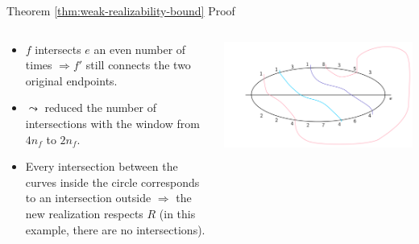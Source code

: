 \documentclass[10pt,aspectratio=169]{beamer}
\theoremstyle{plain}
\begin{document}
\begin{frame}{Theorem \ref{thm:weak-realizability-bound} Proof}
    \begin{columns}
    \begin{column}{0.35\textwidth}
        \begin{itemize}
            \item \(f\) intersects \(e\) an even number of times \(\Rightarrow f'\) still connects the two original endpoints.
            \item<2-> \(\leadsto\) reduced the number of intersections with the window from \(4 n_f\) to \(2 n_f\).
            \item<3-> Every intersection between the curves inside the circle corresponds to an intersection outside \(\Rightarrow\) the new realization respects \(R\) (in this example, there are no intersections).
        \end{itemize}
    \end{column}
    \begin{column}{0.65\textwidth}
        \begin{center}
            \includegraphics[width=\textwidth]{images/figure-9.pdf}
        \end{center}
    \end{column}
    \end{columns}
\end{frame}
\end{document}
